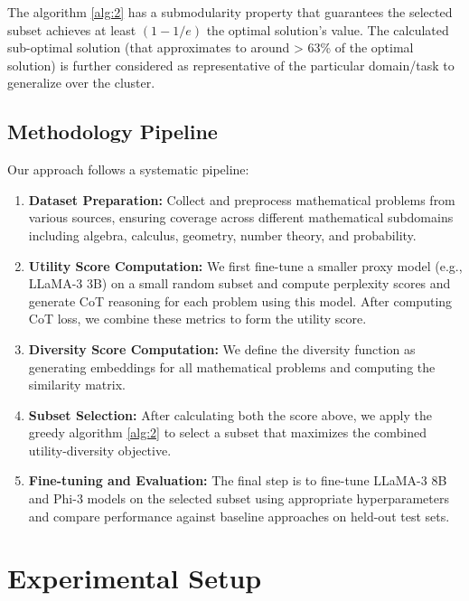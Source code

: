 \documentclass{article}
\begin{document}
The algorithm \ref{alg:2} has a submodularity property that guarantees the selected subset achieves at least $(1-1/e)$ the optimal solution's value. The calculated sub-optimal solution (that approximates to around > 63\% of the optimal solution) is further considered as representative of the particular domain/task to generalize over the cluster.

\subsection{Methodology Pipeline}

Our approach follows a systematic pipeline:

\begin{enumerate}

    \item \textbf{Dataset Preparation:} Collect and preprocess mathematical problems from various sources, ensuring coverage across different mathematical subdomains including algebra, calculus, geometry, number theory, and probability.
    
    \item \textbf{Utility Score Computation:} We first fine-tune a smaller proxy model (e.g., LLaMA-3 3B) on a small random subset and compute perplexity scores and generate CoT reasoning for each problem using this model. After computing CoT loss, we combine these metrics to form the utility score.
    
    \item \textbf{Diversity Score Computation:} We define the diversity function as generating embeddings for all mathematical problems and computing the similarity matrix.
    
    \item \textbf{Subset Selection:} After calculating both the score above, we apply the greedy algorithm \ref{alg:2} to select a subset that maximizes the combined utility-diversity objective.
    
    \item \textbf{Fine-tuning and Evaluation:} The final step is to fine-tune LLaMA-3 8B and Phi-3 models on the selected subset using appropriate hyperparameters and compare performance against baseline approaches on held-out test sets.
    
\end{enumerate}

\section{Experimental Setup}
\end{document}
